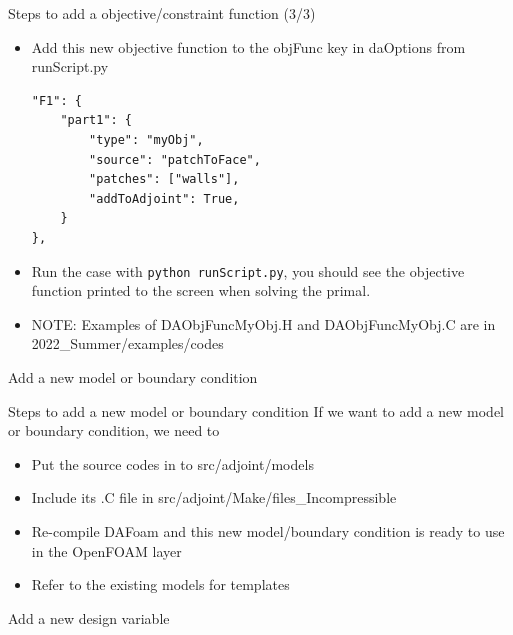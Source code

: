 \documentclass{bredelebeamer}
\begin{document}
\begin{frame}[fragile]{Steps to add a objective/constraint function (3/3)}
\begin{itemize}
  \setlength\itemsep{0.5em}
 \item Add this new objective function to the objFunc key in daOptions from runScript.py
 \footnotesize
 \lstset{ language=python }
 \begin{lstlisting}
"F1": {
    "part1": {
        "type": "myObj",
        "source": "patchToFace",
        "patches": ["walls"],
        "addToAdjoint": True,
    }
},
 \end{lstlisting}
 \normalsize
 \item Run the case with \texttt{python runScript.py}, you should see the objective function printed to the screen when solving the primal.
 \item NOTE: Examples of DAObjFuncMyObj.H and DAObjFuncMyObj.C are in 2022\_Summer/examples/codes
\end{itemize}
\end{frame}

\begin{frame}{}
  \center \Large Add a new model or boundary condition
\end{frame}

\begin{frame}[fragile]{Steps to add a new model or boundary condition}
If we want to add a new model or boundary condition, we need to
\begin{itemize}
  \setlength\itemsep{0.5em}
 \item Put the source codes in to src/adjoint/models
 \item Include its .C file in src/adjoint/Make/files\_Incompressible
 \item Re-compile DAFoam and this new model/boundary condition is ready to use in the OpenFOAM layer
 \item Refer to the existing models for templates
\end{itemize}
\end{frame}

\begin{frame}{}
  \center \Large Add a new design variable
\end{frame}
\end{document}
